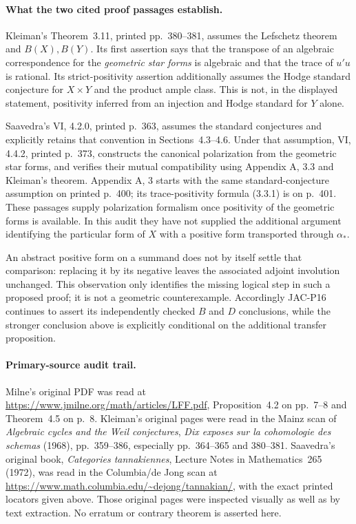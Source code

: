 \paragraph{What the two cited proof passages establish.}
Kleiman's Theorem~3.11, printed pp.~380--381, assumes the
Lefschetz theorem and $B(X),B(Y)$. Its first assertion says
that the transpose of an algebraic correspondence for the
\emph{geometric star forms} is algebraic and that the trace of
$u'u$ is rational. Its strict-positivity assertion additionally
assumes the Hodge standard conjecture for $X\times Y$ and the
product ample class. This is not, in the displayed statement,
positivity inferred from an injection and Hodge standard for
$Y$ alone.

Saavedra's VI, 4.2.0, printed p.~363, assumes the standard
conjectures and explicitly retains that convention in
Sections~4.3--4.6. Under that assumption, VI, 4.4.2, printed
p.~373, constructs the canonical polarization from the
geometric star forms, and verifies their mutual compatibility
using Appendix A, 3.3 and Kleiman's theorem. Appendix A, 3
starts with the same standard-conjecture assumption on printed
p.~400; its trace-positivity formula (3.3.1) is on p.~401.
These passages supply polarization formalism once positivity
of the geometric forms is available. In this audit they have
not supplied the additional argument identifying the particular
form of $X$ with a positive form transported through $\alpha_*$.

An abstract positive form on a summand does not by itself settle
that comparison: replacing it by its negative leaves the
associated adjoint involution unchanged. This observation only
identifies the missing logical step in such a proposed proof;
it is not a geometric counterexample. Accordingly JAC-P16
continues to assert its independently checked $B$ and $D$
conclusions, while the stronger conclusion above is explicitly
conditional on the additional transfer proposition.

\paragraph{Primary-source audit trail.}
Milne's original PDF was read at
\url{https://www.jmilne.org/math/articles/LFF.pdf},
Proposition~4.2 on pp.~7--8 and Theorem~4.5 on p.~8.
Kleiman's original pages were read in the Mainz scan of
\emph{Algebraic cycles and the Weil conjectures},
\emph{Dix exposes sur la cohomologie des schemas} (1968),
pp.~359--386, especially pp.~364--365 and 380--381.
Saavedra's original book, \emph{Categories tannakiennes},
Lecture Notes in Mathematics~265 (1972), was read in the
Columbia/de Jong scan at
\url{https://www.math.columbia.edu/~dejong/tannakian/},
with the exact printed locators given above. Those original
pages were inspected visually as well as by text extraction.
No erratum or contrary theorem is asserted here.
